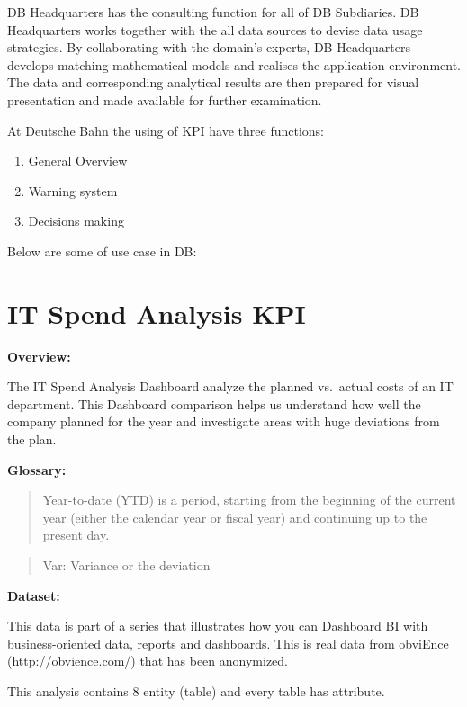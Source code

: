 \documentclass[]{book}
\providecommand{\tightlist}{%
  \setlength{\itemsep}{0pt}\setlength{\parskip}{0pt}}
\begin{document}
DB Headquarters has the consulting function for all of DB Subdiaries. DB
Headquarters works together with the all data sources to devise data
usage strategies. By collaborating with the domain's experts, DB
Headquarters develops matching mathematical models and realises the
application environment. The data and corresponding analytical results
are then prepared for visual presentation and made available for further
examination.

At Deutsche Bahn the using of KPI have three functions:

\begin{enumerate}
\def\labelenumi{\arabic{enumi}.}
\tightlist
\item
  General Overview
\item
  Warning system
\item
  Decisions making
\end{enumerate}

Below are some of use case in DB:

\section{IT Spend Analysis KPI}\label{it-spend-analysis-kpi}

\textbf{Overview:}

The IT Spend Analysis Dashboard analyze the planned vs.~actual costs of
an IT department. This Dashboard comparison helps us understand how well
the company planned for the year and investigate areas with huge
deviations from the plan.

\textbf{Glossary:}

\begin{quote}
Year-to-date (YTD) is a period, starting from the beginning of the
current year (either the calendar year or fiscal year) and continuing up
to the present day.
\end{quote}

\begin{quote}
Var: Variance or the deviation
\end{quote}

\textbf{Dataset:}

This data is part of a series that illustrates how you can Dashboard BI
with business-oriented data, reports and dashboards. This is real data
from obviEnce (\url{http://obvience.com/}) that has been anonymized.

This analysis contains 8 entity (table) and every table has attribute.
\end{document}
